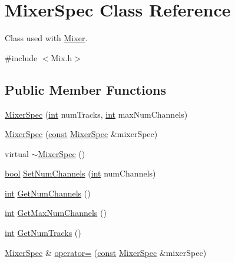 \hypertarget{class_mixer_spec}{}\section{Mixer\+Spec Class Reference}
\label{class_mixer_spec}


Class used with \hyperlink{class_mixer}{Mixer}.  




{\ttfamily \#include $<$Mix.\+h$>$}

\subsection*{Public Member Functions}
\begin{DoxyCompactItemize}
\item 
\hyperlink{class_mixer_spec_afae2333497e64ef2ae8032a1f907ea52}{Mixer\+Spec} (\hyperlink{xmltok_8h_a5a0d4a5641ce434f1d23533f2b2e6653}{int} num\+Tracks, \hyperlink{xmltok_8h_a5a0d4a5641ce434f1d23533f2b2e6653}{int} max\+Num\+Channels)
\item 
\hyperlink{class_mixer_spec_a1cd4c8d14a7e5075cdb3a357d42087ef}{Mixer\+Spec} (\hyperlink{getopt1_8c_a2c212835823e3c54a8ab6d95c652660e}{const} \hyperlink{class_mixer_spec}{Mixer\+Spec} \&mixer\+Spec)
\item 
virtual \hyperlink{class_mixer_spec_ac4db4f47699d8a14c36c48d3adeb23a3}{$\sim$\+Mixer\+Spec} ()
\item 
\hyperlink{mac_2config_2i386_2lib-src_2libsoxr_2soxr-config_8h_abb452686968e48b67397da5f97445f5b}{bool} \hyperlink{class_mixer_spec_ab648082934aa73704d9401151b57e89b}{Set\+Num\+Channels} (\hyperlink{xmltok_8h_a5a0d4a5641ce434f1d23533f2b2e6653}{int} num\+Channels)
\item 
\hyperlink{xmltok_8h_a5a0d4a5641ce434f1d23533f2b2e6653}{int} \hyperlink{class_mixer_spec_ab148f26e7498fb0ee9b06023fbabb416}{Get\+Num\+Channels} ()
\item 
\hyperlink{xmltok_8h_a5a0d4a5641ce434f1d23533f2b2e6653}{int} \hyperlink{class_mixer_spec_ac87de6dedbe23dfd5b0e6e751b06aad4}{Get\+Max\+Num\+Channels} ()
\item 
\hyperlink{xmltok_8h_a5a0d4a5641ce434f1d23533f2b2e6653}{int} \hyperlink{class_mixer_spec_a50f87b11de2f4d91c3f8cc1f4db16cb8}{Get\+Num\+Tracks} ()
\item 
\hyperlink{class_mixer_spec}{Mixer\+Spec} \& \hyperlink{class_mixer_spec_add4f8a4864f9fefe835fca3c45bd8af9}{operator=} (\hyperlink{getopt1_8c_a2c212835823e3c54a8ab6d95c652660e}{const} \hyperlink{class_mixer_spec}{Mixer\+Spec} \&mixer\+Spec)
\end{DoxyCompactItemize}
